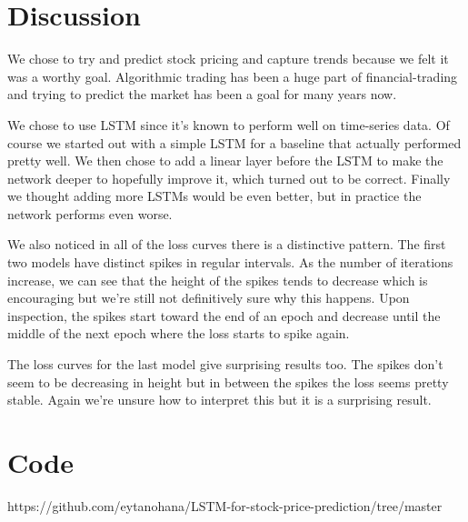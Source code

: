 \documentclass{article}
\begin{document}
\section{Discussion}

We chose to try and predict stock pricing and capture trends because we felt it was a worthy goal. Algorithmic trading has been a huge part of financial-trading and trying to predict the market has been a goal for many years now. 

We chose to use LSTM since it's known to perform well on time-series data. Of course we started out with a simple LSTM for a baseline that actually performed pretty well. We then chose to add a linear layer before the LSTM to make the network deeper to hopefully improve it, which turned out to be correct. Finally we thought adding more LSTMs would be even better, but in practice the network performs even worse. 

We also noticed in all of the loss curves there is a distinctive pattern. The first two models have distinct spikes in regular intervals. As the number of iterations increase, we can see that the height of the spikes tends to decrease which is encouraging but we're still not definitively sure why this happens. Upon inspection, the spikes start toward the end of an epoch and decrease until the middle of the next epoch where the loss starts to spike again.

The loss curves for the last model give surprising results too. The spikes don't seem to be decreasing in height but in between the spikes the loss seems pretty stable. Again we're unsure how to interpret this but it is a surprising result. 




\section{Code}

https://github.com/eytanohana/LSTM-for-stock-price-prediction/tree/master



\end{document}
